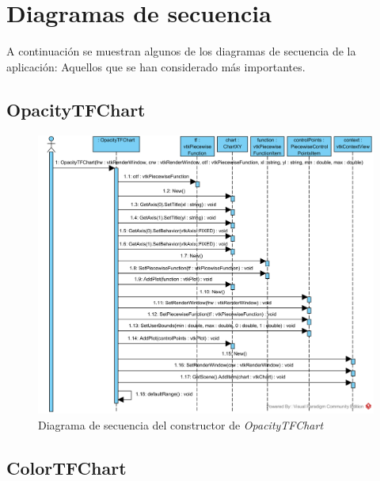 \section{Diagramas de secuencia}

A continuación se muestran algunos de los diagramas de secuencia de la aplicación: Aquellos que se han considerado más importantes.

\subsection{OpacityTFChart}

\begin{figure}[H]
	\centering
	\includegraphics[angle=90,width=12cm]{imagenes/diagramas/secuencia/OpacityTFChart_New}
	\caption{Diagrama de secuencia del constructor de \textit{OpacityTFChart}}
	\label{fig:diagrama_secuencia_opacitytfchart_new}
\end{figure}

\subsection{ColorTFChart}

